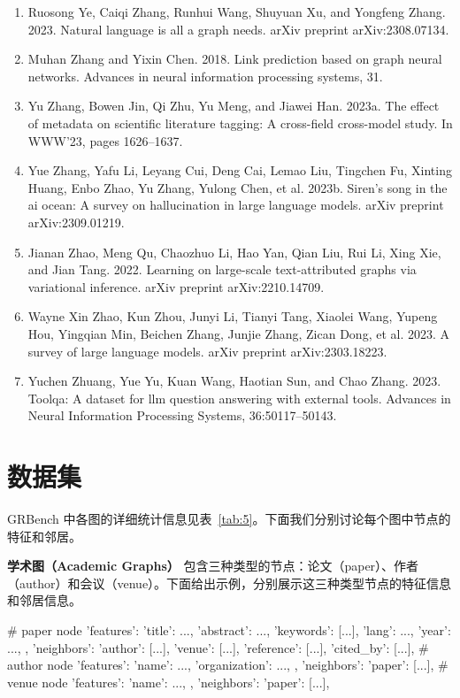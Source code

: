 \documentclass[11pt,UTF8,fontset=fandol]{ctexart}
\begin{document}
\begin{enumerate}[leftmargin=2em]
\item Ruosong Ye, Caiqi Zhang, Runhui Wang, Shuyuan Xu, and Yongfeng Zhang. 2023. Natural language is all a graph needs. arXiv preprint arXiv:2308.07134.
\item Muhan Zhang and Yixin Chen. 2018. Link prediction based on graph neural networks. Advances in neural information processing systems, 31.
\item Yu Zhang, Bowen Jin, Qi Zhu, Yu Meng, and Jiawei Han. 2023a. The effect of metadata on scientific literature tagging: A cross-field cross-model study. In WWW'23, pages 1626--1637.
\item Yue Zhang, Yafu Li, Leyang Cui, Deng Cai, Lemao Liu, Tingchen Fu, Xinting Huang, Enbo Zhao, Yu Zhang, Yulong Chen, et al. 2023b. Siren's song in the ai ocean: A survey on hallucination in large language models. arXiv preprint arXiv:2309.01219.
\item Jianan Zhao, Meng Qu, Chaozhuo Li, Hao Yan, Qian Liu, Rui Li, Xing Xie, and Jian Tang. 2022. Learning on large-scale text-attributed graphs via variational inference. arXiv preprint arXiv:2210.14709.
\item Wayne Xin Zhao, Kun Zhou, Junyi Li, Tianyi Tang, Xiaolei Wang, Yupeng Hou, Yingqian Min, Beichen Zhang, Junjie Zhang, Zican Dong, et al. 2023. A survey of large language models. arXiv preprint arXiv:2303.18223.
\item Yuchen Zhuang, Yue Yu, Kuan Wang, Haotian Sun, and Chao Zhang. 2023. Toolqa: A dataset for llm question answering with external tools. Advances in Neural Information Processing Systems, 36:50117--50143.
\end{enumerate}

\appendix

\section{数据集}

GRBench 中各图的详细统计信息见表~\ref{tab:5}。下面我们分别讨论每个图中节点的特征和邻居。

\textbf{学术图（Academic Graphs）} 包含三种类型的节点：论文（paper）、作者（author）和会议（venue）。下面给出示例，分别展示这三种类型节点的特征信息和邻居信息。

\begin{code}
# paper node
{
    'features': {
        'title': ...,
        'abstract': ...,
        'keywords': [...],
        'lang': ...,
        'year': ...,
        },
    'neighbors': {
        'author': [...],
        'venue': [...],
        'reference': [...],
        'cited_by': [...],
        }
}
# author node
{
    'features': {
        'name': ...,
        'organization': ...,
        },
    'neighbors': {
        'paper': [...],
        }
}
# venue node
{
    'features': {
        'name': ...,
        },
    'neighbors': {
        'paper': [...],
        }
}
\end{code}
\end{document}
